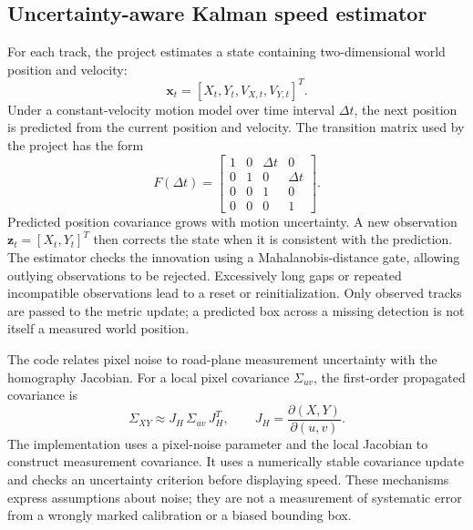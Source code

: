 \subsection{Uncertainty-aware Kalman speed estimator}
For each track, the project estimates a state containing two-dimensional world position and velocity:
\begin{equation}
\mathbf{x}_t=[X_t,Y_t,V_{X,t},V_{Y,t}]^{T}.
\end{equation}
Under a constant-velocity motion model over time interval $\Delta t$, the next position is predicted from the current position and velocity. The transition matrix used by the project has the form
\begin{equation}
F(\Delta t)=
\begin{bmatrix}
1&0&\Delta t&0\\
0&1&0&\Delta t\\
0&0&1&0\\
0&0&0&1
\end{bmatrix}.
\end{equation}
Predicted position covariance grows with motion uncertainty. A new observation $\mathbf z_t=[X_t,Y_t]^T$ then corrects the state when it is consistent with the prediction. The estimator checks the innovation using a Mahalanobis-distance gate, allowing outlying observations to be rejected. Excessively long gaps or repeated incompatible observations lead to a reset or reinitialization. Only observed tracks are passed to the metric update; a predicted box across a missing detection is not itself a measured world position.

The code relates pixel noise to road-plane measurement uncertainty with the homography Jacobian. For a local pixel covariance $\Sigma_{uv}$, the first-order propagated covariance is
\begin{equation}
\Sigma_{XY}\approx J_H\,\Sigma_{uv}\,J_H^T,\qquad
J_H=\frac{\partial(X,Y)}{\partial(u,v)}.
\end{equation}
The implementation uses a pixel-noise parameter and the local Jacobian to construct measurement covariance. It uses a numerically stable covariance update and checks an uncertainty criterion before displaying speed. These mechanisms express assumptions about noise; they are not a measurement of systematic error from a wrongly marked calibration or a biased bounding box.

